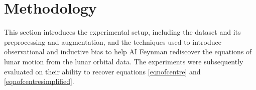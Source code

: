 \documentclass[fleqn,10pt]{olplainarticle}
\numberwithin{equation}{subsection}
\begin{document}
\section{Methodology}
This section introduces the experimental setup, including the dataset and its preprocessing and augmentation, and the techniques used to introduce observational and inductive bias to help AI Feynman rediscover the equations of lunar motion from the lunar orbital data. The experiments were subsequently evaluated on their ability to recover equations \eqref{eqnofcentre} and \eqref{eqnofcentresimplified}.




\end{document}
